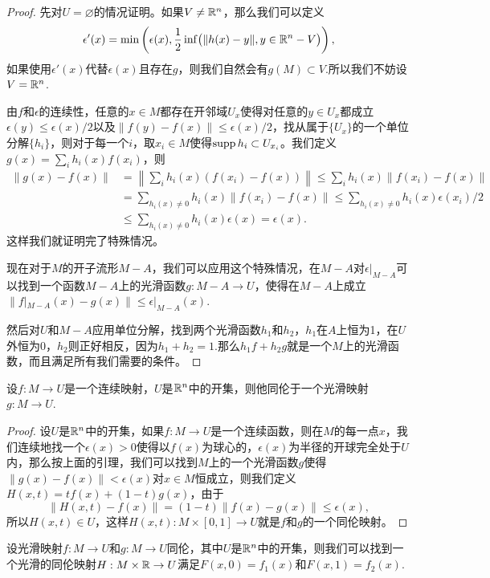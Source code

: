 \begin{proof}
	先对$U=\varnothing$的情况证明。如果$V\neq \mathbb{R}^n$，那么我们可以定义
	\[
		\epsilon'(x)=\min\left(\epsilon(x),\frac{1}{2}\inf\bigl(\|h(x)-y\|,y\in \mathbb{R}^n-V\bigr)\right),
	\]
	如果使用$\epsilon'(x)$代替$\epsilon(x)$且存在$g$，则我们自然会有$g(M)\subset V$.所以我们不妨设$V=\mathbb{R}^n$.

	由$f$和$\epsilon$的连续性，任意的$x\in M$都存在开邻域$U_x$使得对任意的$y\in U_x$都成立$\epsilon(y)\leq \epsilon(x)/2$以及$\|f(y)-f(x)\|\leq \epsilon(x)/2$，找从属于$\{U_x\}$的一个单位分解$\{h_i\}$，则对于每一个$i$，取$x_i\in M$使得$\operatorname{supp} h_i\subset U_{x_i}$。我们定义$g(x)=\sum_i h_i(x)f(x_i)$，则
	\[
	\begin{split}
		\|g(x)-f(x)\|&=\left\|\sum_i h_i(x)(f(x_i)-f(x))\right\|\leq \sum_i h_i(x)\|f(x_i)-f(x)\|\\
		&=\sum_{h_i(x)\neq 0} h_i(x)\|f(x_i)-f(x)\|\leq  \sum_{h_i(x)\neq 0} h_i(x)\epsilon(x_i)/2\\
		&\leq  \sum_{h_i(x)\neq 0} h_i(x)\epsilon(x)=\epsilon(x).
	\end{split}
	\]
	这样我们就证明完了特殊情况。

	现在对于$M$的开子流形$M-A$，我们可以应用这个特殊情况，在$M-A$对$\epsilon|_{M-A}$可以找到一个函数$M-A$上的光滑函数$g:M-A\to U$，使得在$M-A$上成立$\|f|_{M-A}(x)-g(x)\|\leq \epsilon|_{M-A}(x)$.

	然后对$U$和$M-A$应用单位分解，找到两个光滑函数$h_1$和$h_2$，$h_1$在$A$上恒为1，在$U$外恒为0，$h_2$则正好相反，因为$h_1+h_2=1$.那么$h_1f+h_2g$就是一个$M$上的光滑函数，而且满足所有我们需要的条件。
\end{proof}

\begin{pro}
设$f:M\to U$是一个连续映射，$U$是$\mathbb{R}^n$中的开集，则他同伦于一个光滑映射$g:M\to U$.
\end{pro}

\begin{proof}
设$U$是$\mathbb{R}^n$中的开集，如果$f:M\to U$是一个连续函数，则在$M$的每一点$x$，我们连续地找一个$\epsilon(x)>0$使得以$f(x)$为球心的，$\epsilon(x)$为半径的开球完全处于$U$内，那么按上面的引理，我们可以找到$M$上的一个光滑函数$g$使得$\|g(x)-f(x)\|<\epsilon(x)$对$x\in M$恒成立，则我们定义$H(x,t)=tf(x)+(1-t)g(x)$，由于
\[
	\|H(x,t)-f(x)\|=(1-t)\|f(x)-g(x)\|\leq \epsilon(x),
\]
所以$H(x,t)\in U$，这样$H(x,t):M\times [0,1]\to U$就是$f$和$g$的一个同伦映射。
\end{proof}

\begin{lem}
设光滑映射$f:M\to U$和$g:M\to U$同伦，其中$U$是$\mathbb{R}^n$中的开集，则我们可以找到一个光滑的同伦映射$H:M\times \mathbb{R}\to U$满足$F(x,0)=f_1(x)$和$F(x,1)=f_2(x)$.
\end{lem}

